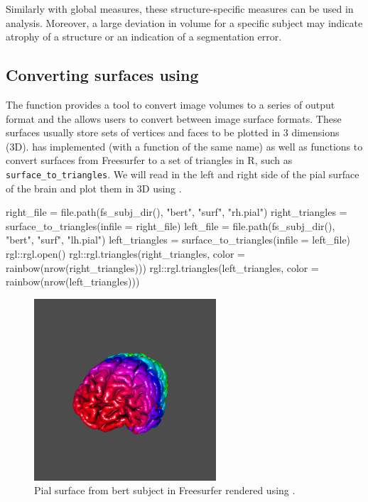 Similarly with global measures, these structure-specific measures can be
used in analysis. Moreover, a large deviation in volume for a specific
subject may indicate atrophy of a structure or an indication of a
segmentation error.

\subsection{\texorpdfstring{Converting surfaces using
}{Converting surfaces using }}\label{converting-surfaces-using}

The  function provides a tool to convert image
volumes to a series of output format and the  allows
users to convert between image surface formats. These surfaces usually
store sets of vertices and faces to be plotted in 3 dimensions (3D).
 has implemented  (with a function
of the same name) as well as functions to convert surfaces from
Freesurfer to a set of triangles in R, such as
\texttt{surface\_to\_triangles}. We will read in the left and right side
of the pial surface of the brain and plot them in 3D using 
\citep{rgl}.

\begin{Schunk}
\begin{Sinput}
right_file = file.path(fs_subj_dir(), 
                   "bert", "surf", "rh.pial")
right_triangles = surface_to_triangles(infile = right_file)
left_file = file.path(fs_subj_dir(), 
                   "bert", "surf", "lh.pial")
left_triangles = surface_to_triangles(infile = left_file) 
rgl::rgl.open()
rgl::rgl.triangles(right_triangles, 
                   color = rainbow(nrow(right_triangles)))
rgl::rgl.triangles(left_triangles, 
                   color = rainbow(nrow(left_triangles)))
\end{Sinput}
\end{Schunk}

\begin{figure}
\centering
\includegraphics{Freesurfer_files/figure-latex/rgl_plot_out.png}
\caption{Pial surface from bert subject in Freesurfer rendered using
.}
\end{figure}

